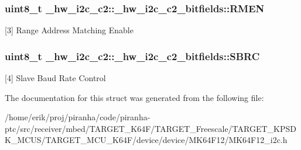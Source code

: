 \subsubsection[{\texorpdfstring{R\+M\+EN}{RMEN}}]{\setlength{\rightskip}{0pt plus 5cm}uint8\+\_\+t \+\_\+hw\+\_\+i2c\+\_\+c2\+::\+\_\+hw\+\_\+i2c\+\_\+c2\+\_\+bitfields\+::\+R\+M\+EN}\hypertarget{struct__hw__i2c__c2_1_1__hw__i2c__c2__bitfields_a807e9baf01208a808214e1718cb3606b}{}\label{struct__hw__i2c__c2_1_1__hw__i2c__c2__bitfields_a807e9baf01208a808214e1718cb3606b}
\mbox{[}3\mbox{]} Range Address Matching Enable 
\subsubsection[{\texorpdfstring{S\+B\+RC}{SBRC}}]{\setlength{\rightskip}{0pt plus 5cm}uint8\+\_\+t \+\_\+hw\+\_\+i2c\+\_\+c2\+::\+\_\+hw\+\_\+i2c\+\_\+c2\+\_\+bitfields\+::\+S\+B\+RC}\hypertarget{struct__hw__i2c__c2_1_1__hw__i2c__c2__bitfields_ad37b981d40c2e95f72e16c2838bf3ed3}{}\label{struct__hw__i2c__c2_1_1__hw__i2c__c2__bitfields_ad37b981d40c2e95f72e16c2838bf3ed3}
\mbox{[}4\mbox{]} Slave Baud Rate Control 

The documentation for this struct was generated from the following file\+:\begin{DoxyCompactItemize}
\item 
/home/erik/proj/piranha/code/piranha-\/ptc/src/receiver/mbed/\+T\+A\+R\+G\+E\+T\+\_\+\+K64\+F/\+T\+A\+R\+G\+E\+T\+\_\+\+Freescale/\+T\+A\+R\+G\+E\+T\+\_\+\+K\+P\+S\+D\+K\+\_\+\+M\+C\+U\+S/\+T\+A\+R\+G\+E\+T\+\_\+\+M\+C\+U\+\_\+\+K64\+F/device/device/\+M\+K64\+F12/M\+K64\+F12\+\_\+i2c.\+h\end{DoxyCompactItemize}
